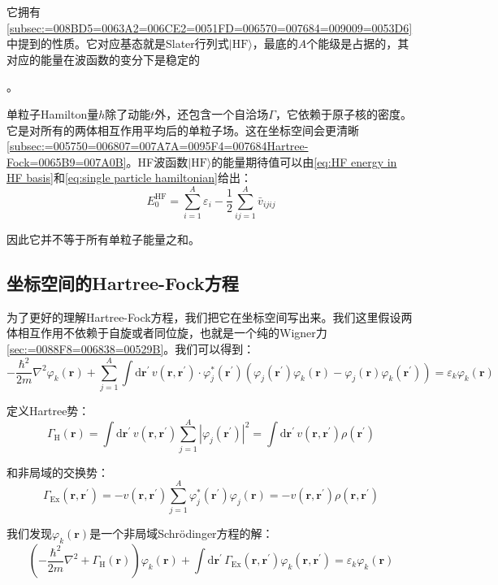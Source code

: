 它拥有\ref{subsec:=008BD5=0063A2=006CE2=0051FD=006570=007684=009009=0053D6}中提到的性质。它对应基态就是Slater行列式$|\text{HF}\rangle$，最底的$A$个能级是占据的，其对应的能量在波函数的变分下是稳定的

。

单粒子Hamilton量$h$除了动能$t$外，还包含一个自洽场$\Gamma$，它依赖于原子核的密度。它是对所有的两体相互作用平均后的单粒子场。这在坐标空间会更清晰\ref{subsec:=005750=006807=007A7A=0095F4=007684Hartree-Fock=0065B9=007A0B}。HF波函数$|\text{HF}\rangle$的能量期待值可以由\ref{eq:HF energy in HF basis}和\ref{eq:single particle hamiltonian}给出：
\[
E^{\text{HF}}_{0}=\sum^{A}_{i=1}\varepsilon_{i}-\frac{1}{2}\sum^{A}_{ij=1}\bar{v}_{ijij}
\]

因此它并不等于所有单粒子能量之和。

\subsection{坐标空间的Hartree-Fock方程\label{subsec:=005750=006807=007A7A=0095F4=007684Hartree-Fock=0065B9=007A0B}}

为了更好的理解Hartree-Fock方程，我们把它在坐标空间写出来。我们这里假设两体相互作用不依赖于自旋或者同位旋，也就是一个纯的Wigner力\ref{sec:=0088F8=006838=00529B}。我们可以得到：
\[
-\frac{\hbar^{2}}{2m}\nabla^{2}\varphi_{k}(\boldsymbol{r})+\sum^{A}_{j=1}\int\mathrm{d}\boldsymbol{r}^{\prime}\,v(\boldsymbol{r},\boldsymbol{r}^{\prime})\cdot\varphi^{*}_{j}(\boldsymbol{r}^{\prime})\left(\varphi_{j}(\boldsymbol{r}^{\prime})\varphi_{k}(\boldsymbol{r})-\varphi_{j}(\boldsymbol{r})\varphi_{k}(\boldsymbol{r}^{\prime})\right)=\varepsilon_{k}\varphi_{k}(\boldsymbol{r})
\]

定义Hartree势：
\[
\Gamma_{\text{H}}(\boldsymbol{r})=\int\mathrm{d}\boldsymbol{r}^{\prime}\,v(\boldsymbol{r},\boldsymbol{r}^{\prime})\sum^{A}_{j=1}\left|\varphi_{j}(\boldsymbol{r}^{\prime})\right|^{2}=\int\mathrm{d}\boldsymbol{r}^{\prime}\,v(\boldsymbol{r},\boldsymbol{r}^{\prime})\rho(\boldsymbol{r}^{\prime})
\]

和非局域的交换势：
\[
\Gamma_{\text{Ex}}(\boldsymbol{r},\boldsymbol{r}^{\prime})=-v(\boldsymbol{r},\boldsymbol{r}^{\prime})\sum^{A}_{j=1}\varphi^{*}_{j}(\boldsymbol{r}^{\prime})\varphi_{j}(\boldsymbol{r})=-v(\boldsymbol{r},\boldsymbol{r}^{\prime})\rho(\boldsymbol{r},\boldsymbol{r}^{\prime})
\]

我们发现$\varphi_{k}(\boldsymbol{r})$是一个非局域Schr\"odinger方程的解：
\[
\left(-\frac{\hbar^{2}}{2m}\nabla^{2}+\Gamma_{\text{H}}(\boldsymbol{r})\right)\varphi_{k}(\boldsymbol{r})+\int\mathrm{d}\boldsymbol{r}^{\prime}\,\Gamma_{\text{Ex}}(\boldsymbol{r},\boldsymbol{r}^{\prime})\varphi_{k}(\boldsymbol{r},\boldsymbol{r}^{\prime})=\varepsilon_{k}\varphi_{k}(\boldsymbol{r})
\]

